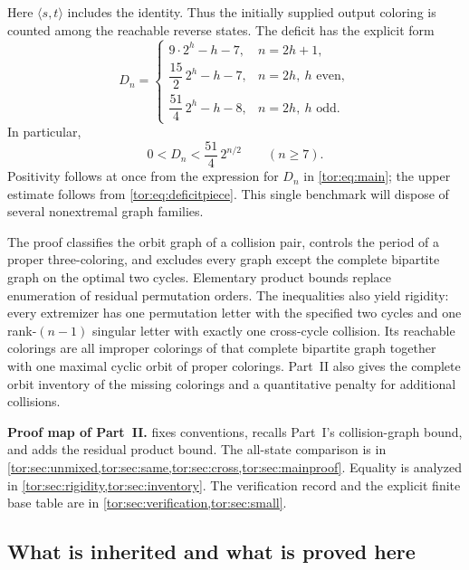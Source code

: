 \documentclass[11pt,a4paper]{article}
\numberwithin{equation}{section}
\theoremstyle{definition}
\theoremstyle{remark}
\begin{document}
Here $\langle s,t\rangle$ includes the identity. Thus the initially supplied
output coloring is counted among the reachable reverse states. The deficit
has the explicit form
\begin{equation}\label{tor:eq:deficitpiece}
 D_n=
 \begin{cases}
 9\cdot2^h-h-7,&n=2h+1,\\
 \dfrac{15}{2}\,2^h-h-7,&n=2h,\ h\text{ even},\\[1mm]
 \dfrac{51}{4}\,2^h-h-8,&n=2h,\ h\text{ odd}.
 \end{cases}
\end{equation}
In particular,
\begin{equation}\label{tor:eq:benchmark}
 0<D_n<\frac{51}{4}\,2^{n/2}\qquad(n\ge7).
\end{equation}
Positivity follows at once from the expression for $D_n$ in
\eqref{tor:eq:main}; the upper estimate follows from
\eqref{tor:eq:deficitpiece}. This single benchmark will dispose of several
nonextremal graph families.

The proof classifies the orbit graph of a collision pair, controls the period
of a proper three-coloring, and excludes every graph except the complete
bipartite graph on the optimal two cycles. Elementary product bounds replace
enumeration of residual permutation orders. The inequalities also yield
rigidity: every extremizer has one permutation letter with the specified two
cycles and one rank-$(n-1)$ singular letter with exactly one cross-cycle
collision. Its reachable colorings are all improper colorings of that complete
bipartite graph together with one maximal cyclic orbit of proper colorings.
Part~II also gives the complete orbit inventory of the missing colorings and a
quantitative penalty for additional collisions.

\begin{resultbox}
\textbf{Proof map of Part~II.}  fixes conventions,
recalls Part~I's collision-graph bound, and adds the residual product bound.
The all-state comparison is in
\cref{tor:sec:unmixed,tor:sec:same,tor:sec:cross,tor:sec:mainproof}. Equality
is analyzed in \cref{tor:sec:rigidity,tor:sec:inventory}. The verification
record and the explicit finite base table are in
\cref{tor:sec:verification,tor:sec:small}.
\end{resultbox}

\subsection{What is inherited and what is proved here}\label{tor:sec:inherited}
\end{document}
